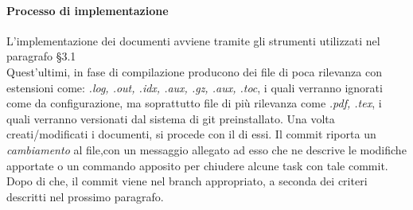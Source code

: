 \paragraph{Processo di implementazione ~\\}
L'implementazione dei documenti avviene tramite gli strumenti utilizzati nel paragrafo §3.1\\
Quest'ultimi, in fase di compilazione producono dei file di poca rilevanza con estensioni come: \textit{.log, .out, .idx, .aux, .gz, .aux, .toc},
i quali verranno ignorati come da configurazione, ma soprattutto file di più rilevanza
come \textit{.pdf, .tex}, i quali verranno versionati dal sistema di git preinstallato.  
Una volta creati/modificati i documenti, si procede con il  di essi. Il commit riporta un \textit{cambiamento} al file,con un messaggio allegato ad esso che ne 
descrive le modifiche apportate o un commando apposito per chiudere alcune task con tale commit. Dopo di che, il commit viene  nel branch appropriato, 
a seconda dei criteri descritti nel prossimo paragrafo. 

